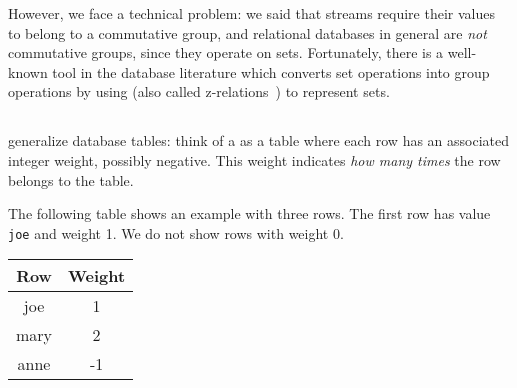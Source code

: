 However, we face a technical problem: we said that streams require
their values to belong to a commutative group, and relational
databases in general are \emph{not} commutative groups, since they
operate on sets.  Fortunately, there is a well-known tool in the
database literature which converts set operations into group
operations by using \zrs (also called z-relations~\cite{green-tcs11})
to represent sets.

\subsection{\zrs}

\zrs generalize database tables: think of a \zr as a table where each
row has an associated integer weight, possibly negative.  This weight
indicates \emph{how many times} the row belongs to the table.

%


The following table shows an example \zr with three rows.  The first
row has value \texttt{joe} and weight 1.  We do not show rows with
weight 0.
%
\begin{center}
\begin{tabular}{|c|c|}\hline
  Row & Weight \\ \hline
  joe & 1 \\
  mary & 2 \\
  anne & -1 \\ \hline
\end{tabular}
\end{center}

